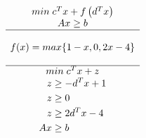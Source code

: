 \documentclass{article}
\begin{document}
\begin{preview}
\begin{center}
                        \paragraph{}
                        \begin{math}
                                \begin{matrix}
                                        min \; c^{T}x + f \left( d^Tx \right) \\
                                        Ax \geq{b} \\
                                        \hline
                                        \\
                                        f(x) = max\{ 1 - x, 0, 2x -4 \} \\
                                        \\
                                        \hline
                                        min \; c^{T}x + z \\
                                        \begin{aligned}
                                                z & \geq{ - d^{T}x + 1 } \\
                                                z & \geq{ 0 } \\
                                                z & \geq{ 2 d^{T}x - 4 } \\
                                                Ax & \geq{b}
                                        \end{aligned}
                                \end{matrix}
                        \end{math}
                \end{center}
        \end{preview}
\end{document}
